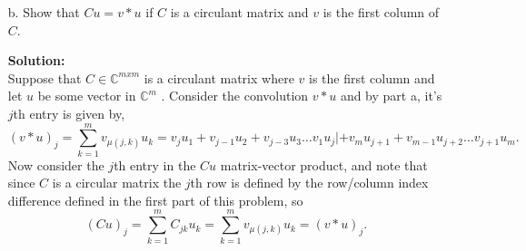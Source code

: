 \documentclass[12pt]{article}
\makeatletter
\theoremstyle{homework}
\newenvironment{exercise}[1]
{\def\@currentlabel{#1}\exercisecore}
{\endexercisecore}
\newcommand{\localhead}[1]{\par\smallskip\noindent\textbf{#1}\nobreak\\}%
\newcommand\solution{\localhead{Solution:}}
\newcommand{\Cplx}{\ensuremath{\mathbb C}}
\let\CC\Cplx
\makeatother
\begin{document}
\begin{exercise}{P23}
\begin{enumerate}
    \item[b.] Show that $Cu = v*u$ if $C$ is a circulant matrix and $v$ is the first column of $C$.
    \solution Suppose that $C \in \CC^{mxm}$ is a circulant matrix where $v$ is the first column and let 
    $u$ be some vector in $\CC^{m}$ . Consider the convolution $v*u$ and by part a, it's $j$th entry is given by, 
    \begin{equation*}
      (v*u)_j = \sum_{k = 1}^m v_{\mu(j,k)}u_k = v_ju_1 + v_{j-1}u_2 + v_{j-3}u_3 \dots v_1u_j| + v_mu_{j+1} + v_{m-1}u_{j+2} \dots v_{j+1}u_{m}.
    \end{equation*}
    Now consider the $j$th entry in the $Cu$ matrix-vector product, and note that since $C$ is a circular matrix the $j$th row is defined by the 
    row/column index difference defined in the first part of this problem, so
    \begin{equation*}
      (Cu)_j = \sum_{k = 1}^m C_{jk}u_k = \sum_{k = 1}^m v_{\mu(j,k)}u_k = (v*u)_j. 
    \end{equation*}
    \vspace{1in}





\end{enumerate}
\end{exercise}
\end{document}
